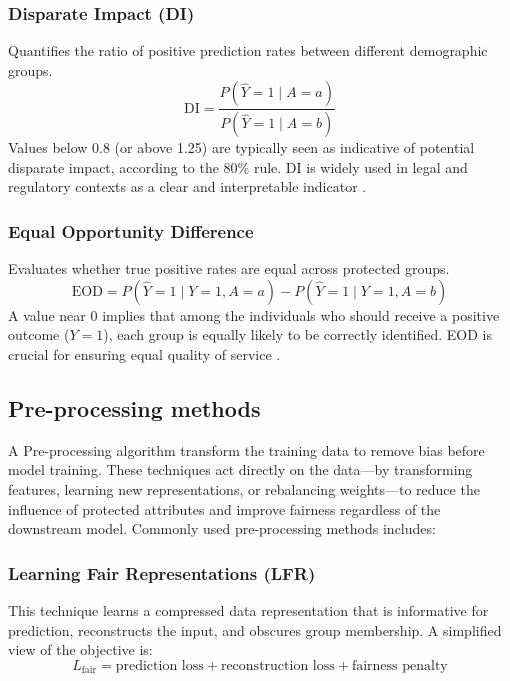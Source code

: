 \documentclass[12pt,a4paper,openright,twoside]{book}
\begin{document}
\subsubsection{Disparate Impact (DI)} 
Quantifies the ratio of positive prediction rates between different demographic groups.
\begin{equation}
    \text{DI} = \frac{P(\hat{Y}=1 \mid A=a)}{P(\hat{Y}=1 \mid A=b)}
\end{equation}
Values below 0.8 (or above 1.25) are typically seen as indicative of potential disparate impact, according to the 80\% rule. DI is widely used in legal and regulatory contexts as a clear and interpretable indicator \cite{feldman2015certifyingremovingdisparateimpact}.

\subsubsection{Equal Opportunity Difference} 
Evaluates whether true positive rates are equal across protected groups.
\begin{equation}
    \text{EOD} = P(\hat{Y}=1 \mid Y=1, A=a) - P(\hat{Y}=1 \mid Y=1, A=b)
\end{equation}
A value near 0 implies that among the individuals who should receive a positive outcome (\begin{math}
{Y=1} \end{math}), each group is equally likely to be correctly identified. EOD is crucial for ensuring equal quality of service \cite{hardt2016equalityopportunitysupervisedlearning}.


\subsection{Pre-processing methods} 
A Pre-processing algorithm transform the training data to remove bias before model training. These techniques act directly on the data—by transforming features, learning new representations, or rebalancing weights—to reduce the influence of protected attributes and improve fairness regardless of the downstream model. Commonly used pre-processing methods includes:

\subsubsection{Learning Fair Representations (LFR)} This technique learns a compressed data representation that is informative for prediction, reconstructs the input, and obscures group membership.
A simplified view of the objective is:
\begin{equation}
    {L}_{\text{fair}} = \text{prediction loss} + \text{reconstruction loss} + \text{fairness penalty}
\end{equation}
\end{document}
